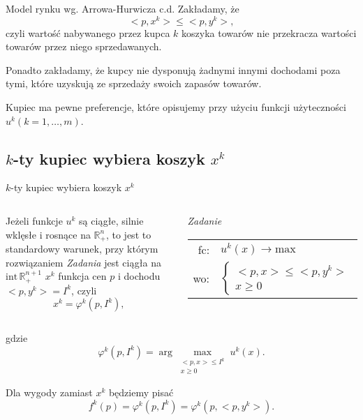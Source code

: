 \documentclass[a4paper, 11pt]{beamer}
\begin{document}
      \begin{frame}{Model rynku wg. Arrowa-Hurwicza c.d.}
	Zakładamy, że
	\[ <p, x^k> \leq <p,y^k>, \]
	czyli wartość nabywanego przez kupca $k$ koszyka towarów nie przekracza
	wartości towarów przez niego sprzedawanych.

	\vskip10pt
	Ponadto zakładamy, że kupcy nie dysponują żadnymi innymi dochodami poza
	tymi, które uzyskują ze sprzedaży swoich zapasów towarów.

	\vskip10pt
	Kupiec ma pewne preferencje, które opisujemy przy użyciu funkcji
	użyteczności $u^k (k=1, \ldots, m)$.

      \end{frame}

    \subsection{$k$-ty kupiec wybiera koszyk $x^k$}

      \begin{frame}{$k$-ty kupiec wybiera koszyk $x^k$}

	\begin{columns}
	    Jeżeli funkcje $u^k$ są ciągłe, silnie wklęsłe i rosnące
	    na $\mathbb{R}^n_{+}$, to jest to standardowy warunek, przy którym
	    rozwiązaniem \textit{Zadania} jest ciągła na $\text{int} \,
	    \mathbb{R}^{n+1}_{+}$  $x^k$ funkcja cen $p$ i dochodu $<p, y^k> = I^k$,
	    czyli
	    \[ x^k = \varphi^k (p, I^k), \]

	    \begin{block}{\textit{Zadanie}}
	      \begin{tabular}{rl}
		fc: & $u^k(x) \to \text{max}$\\
		wo: & $\left\{\begin{array}{l}
				  <p, x> \leq <p, y^k>\\ 
				  x \geq 0 
			      \end{array}
		       \right.$
	      \end{tabular}
	    \end{block}
       \end{columns}

    \vskip3pt
          gdzie
     \[ \varphi^k (p, I^k) = \arg \max_{\begin{array}{c} <p, x> \leq I^k\\ x
     \geq 0 \end{array}} u^k(x). \]

     Dla wygody zamiast $x^k$ będziemy pisać $$f^k(p) = \varphi^k (p, I^k) =
     \varphi^k (p, <p, y^k>).$$

    \end{frame}
\end{document}
